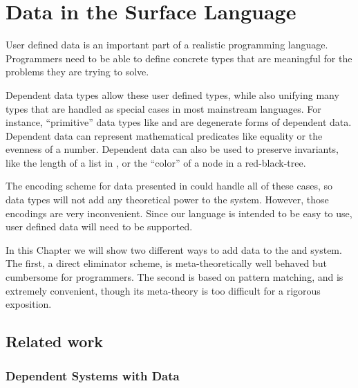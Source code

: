 \chapter{Data in the Surface Language}
\label{chapter:SurfaceData}
\thispagestyle{myheadings}

User defined data is an important part of a realistic programming language.
Programmers need to be able to define concrete types that are meaningful for the problems they are trying to solve.

Dependent data types allow these user defined types, while also unifying many types that are handled as special cases in most mainstream languages.
For instance, ``primitive'' data types like \Nat{} and \Bool{} are degenerate forms of dependent data.
Dependent data can represent mathematical predicates like equality or the evenness of a number.
Dependent data can also be used to preserve invariants, like the length of a list in \Vect{}, or the ``color'' of a node in a red-black-tree.

The encoding scheme for data presented in  could handle all of these cases, so data types will not add any theoretical power to the system.
However, those encodings are very inconvenient. 
Since our language is intended to be easy to use, user defined data will need to be supported.

In this Chapter we will show two different ways to add data to the \slang{} and \bidir{} system.
The first, a direct eliminator scheme, is meta-theoretically well behaved but cumbersome for programmers.
The second is based on pattern matching, and is extremely convenient, though its meta-theory is too difficult for a rigorous exposition.






\section{Related work}

\subsection{Dependent Systems with Data}

